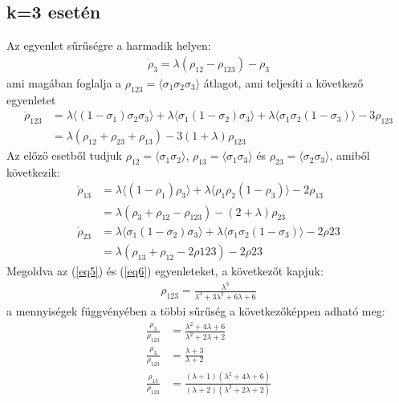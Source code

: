 \documentclass{article}
\begin{document}
	\subsection{k=3 esetén}
	Az egyenlet sűrűségre a harmadik helyen:
	\begin{align}
		\dot{\rho}_3=\lambda(\rho_{12}-\rho_{123})-\rho_3
	\end{align}
	ami magában foglalja a $\rho_{123}=\langle\sigma_1\sigma_2\sigma_3\rangle$ átlagot, ami teljesíti a következő egyenletet
	\begin{align}
		\label{eq5}
		\dot{\rho}_{123}&=\lambda\langle(1-\sigma_1)\sigma_2\sigma_3\rangle+\lambda\langle\sigma_1(1-\sigma_2)\sigma_3\rangle+\lambda\langle\sigma_1\sigma_2(1-\sigma_3)\rangle-3\rho_{123}\nonumber\\
		&=\lambda(\rho_{12}+\rho_{23}+\rho_{13})-3(1+\lambda)\rho_{123}
	\end{align}
	Az előző esetből tudjuk $\rho_{12}=\langle\sigma_1\sigma_2\rangle$, $\rho_{13}=\langle\sigma_1\sigma_3\rangle$ és $\rho_{23}=\langle\sigma_2\sigma_3\rangle$, amiből következik:
	\begin{align}
		\label{eq6}
		\dot{\rho}_{13}&=\lambda\langle(1-\rho_1)\rho_3\rangle+\lambda\langle\rho_1\rho_2(1-\rho_3)\rangle-2\rho_{13}\nonumber\\
		&=\lambda(\rho_3+\rho_{12}-\rho_{123})-(2+\lambda)\rho_{23}\nonumber\\
		\dot{\rho}_{23}&=\lambda\langle\sigma_1(1-\sigma_2)\sigma_3\rangle+\lambda\langle\sigma_1\sigma_2(1-\sigma_3)\rangle-2\rho{23}\nonumber\\
		&=\lambda(\rho_{13}+\rho_{12}-2\rho{123})-2\rho{23}
	\end{align}
	Megoldva az (\ref{eq5}) és (\ref{eq6}) egyenleteket, a következőt kapjuk:
	\begin{align}
		\rho_{123}=\frac{\lambda^3}{\lambda^3+3\lambda^2+6\lambda+6}
	\end{align}
	a mennyiségek függvényében a többi sűrűség a következőképpen adható meg:
	\begin{align*}
		\frac{\rho_3}{\rho_{123}}&=\frac{\lambda^2+4\lambda+6}{\lambda^2+2\lambda+2}\\
		\frac{\rho_3}{\rho_{123}}&=\frac{\lambda+3}{\lambda+2}\\
		\frac{\rho_{13}}{\rho_{123}}&=\frac{(\lambda+1)(\lambda^2+4\lambda+6)}{(\lambda+2)(\lambda^2+2\lambda+2)}
	\end{align*}
\end{document}
